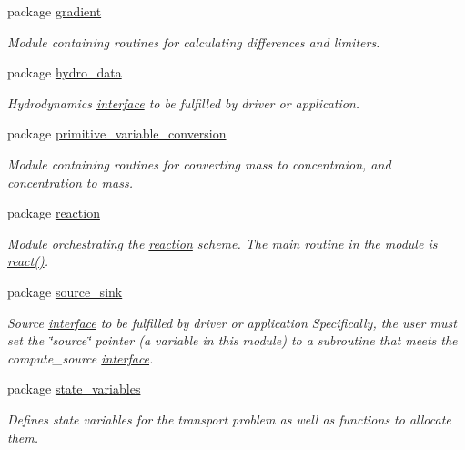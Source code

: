 \begin{CompactItemize}
\item 
package \hyperlink{a00061}{gradient}
\begin{CompactList}\small\item\em Module containing routines for calculating differences and limiters. \item\end{CompactList}

\item 
package \hyperlink{a00063}{hydro\_\-data}
\begin{CompactList}\small\item\em Hydrodynamics \hyperlink{a00001}{interface} to be fulfilled by driver or application. \item\end{CompactList}

\item 
package \hyperlink{a00067}{primitive\_\-variable\_\-conversion}
\begin{CompactList}\small\item\em Module containing routines for converting mass to concentraion, and concentration to mass. \item\end{CompactList}

\item 
package \hyperlink{a00068}{reaction}
\begin{CompactList}\small\item\em Module orchestrating the \hyperlink{a00068}{reaction} scheme. The main routine in the module is \hyperlink{a00068_ce059846828705ce745ad6a3549d3d8a}{react()}. \item\end{CompactList}

\item 
package \hyperlink{a00069}{source\_\-sink}
\begin{CompactList}\small\item\em Source \hyperlink{a00002}{interface} to be fulfilled by driver or application Specifically, the user must set the \char`\"{}source\char`\"{} pointer (a variable in this module) to a subroutine that meets the compute\_\-source \hyperlink{a00002}{interface}. \item\end{CompactList}

\item 
package \hyperlink{a00070}{state\_\-variables}
\begin{CompactList}\small\item\em Defines state variables for the transport problem as well as functions to allocate them. \item\end{CompactList}


\end{CompactItemize}
